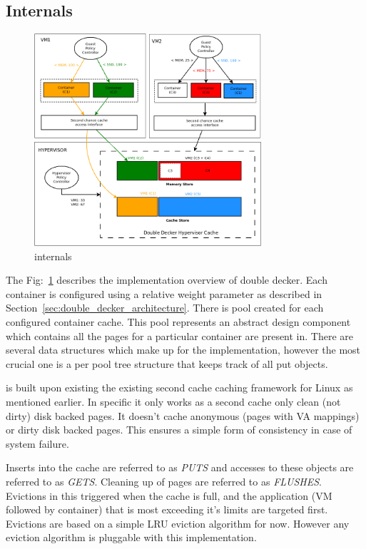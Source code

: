     \subsection{Internals}
    
      \begin{figure}
	\centering
	\includegraphics[width=0.75\textwidth]{images/background/single_level_implementation.png}
	\caption{\dd{} internals}
	\label{img:doube_decker_internals}
      \end{figure}
	  
	The Fig:~\ref{img:doube_decker_internals} describes the \tmem{} implementation overview of double decker. Each container is configured using a
	relative weight parameter as described in Section~\ref{sec:double_decker_architecture}. There is pool created for each configured container cache. This
	pool represents an abstract design component which contains all the pages for a particular container are present in. 
	There are several data structures which make up  for the \tmem implementation, however the most crucial one is a per pool tree structure that keeps 
	track of all put objects.
	
	\dd{} is built upon existing the existing \tmem{} second cache caching framework for Linux as mentioned earlier. In specific it only works as a second
	cache only clean (not dirty) disk backed pages. It doesn't cache anonymous (pages with VA mappings) or dirty disk backed pages. This ensures a simple 
	form of consistency in case of system failure. 
	
	Inserts into the cache are referred to as \textit{PUTS} and accesses to these objects are referred to as \textit{GETS}. Cleaning up of pages are referred
	to as \textit{FLUSHES}. Evictions in this triggered when the cache is full, and the application (VM followed by container) that is most exceeding it's 
	limits are targeted first. Evictions are based on a simple LRU eviction algorithm for now. However any eviction algorithm is pluggable with this implementation.
  
    
  
      

      